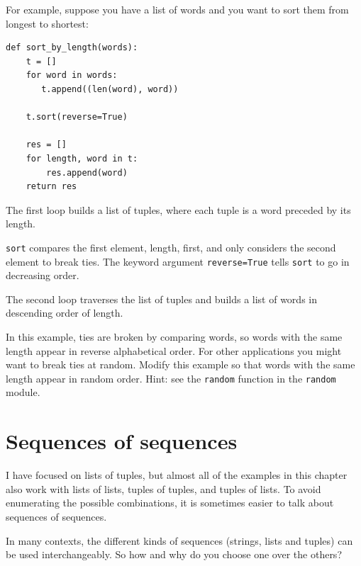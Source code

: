 \documentclass[10pt]{book}
\begin{document}
\label{DSU}

For example, suppose you have a list of words and you want to
sort them from longest to shortest:

\beforeverb
\begin{verbatim}
def sort_by_length(words):
    t = []
    for word in words:
       t.append((len(word), word))

    t.sort(reverse=True)

    res = []
    for length, word in t:
        res.append(word)
    return res
\end{verbatim}
\afterverb
%
The first loop builds a list of tuples, where each
tuple is a word preceded by its length.

{\tt sort} compares the first element, length, first, and
only considers the second element to break ties.  The keyword argument
{\tt reverse=True} tells {\tt sort} to go in decreasing order.


The second loop traverses the list of tuples and builds a list of
words in descending order of length.

\begin{ex}
In this example, ties are broken by comparing words, so words
with the same length appear in reverse alphabetical order.  For other
applications you might want to break ties at random.  Modify
this example so that words with the same length appear in
random order.  Hint: see the {\tt random} function in the
{\tt random} module.


\end{ex}


\section{Sequences of sequences}

I have focused on lists of tuples, but almost all of the examples in
this chapter also work with lists of lists, tuples of tuples, and
tuples of lists.  To avoid enumerating the possible combinations, it
is sometimes easier to talk about sequences of sequences.

In many contexts, the different kinds of sequences (strings, lists and
tuples) can be used interchangeably.  So how and why do you choose one
over the others?
\end{document}
